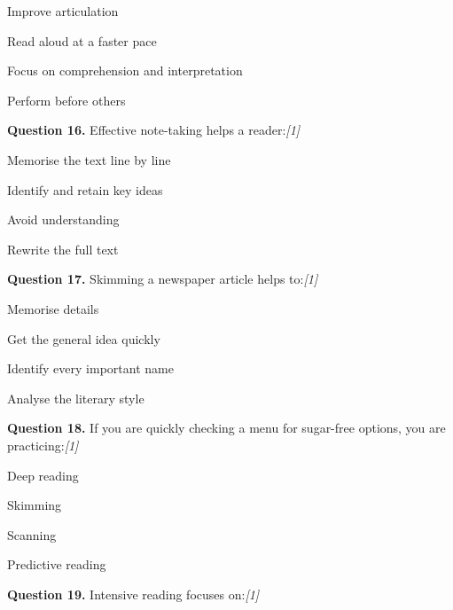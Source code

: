 \documentclass[11pt,a4paper]{article}
\newcommand{\pts}[1]{\hfill \textit{[#1]}}
\begin{document}
\begin{parts}
  \item Improve articulation
  \item Read aloud at a faster pace
  \item Focus on comprehension and interpretation
  \item Perform before others
\end{parts}

\medskip




\noindent \textbf{Question 16.} Effective note-taking helps a reader:\pts{1}

\begin{parts}
  \item Memorise the text line by line
  \item Identify and retain key ideas
  \item Avoid understanding
  \item Rewrite the full text
\end{parts}

\medskip




\noindent \textbf{Question 17.} Skimming a newspaper article helps to:\pts{1}

\begin{parts}
  \item Memorise details
  \item Get the general idea quickly
  \item Identify every important name
  \item Analyse the literary style
\end{parts}

\medskip




\noindent \textbf{Question 18.} If you are quickly checking a menu for sugar-free options, you are practicing:\pts{1}

\begin{parts}
  \item Deep reading
  \item Skimming
  \item Scanning
  \item Predictive reading
\end{parts}

\medskip




\noindent \textbf{Question 19.} Intensive reading focuses on:\pts{1}
\end{document}
